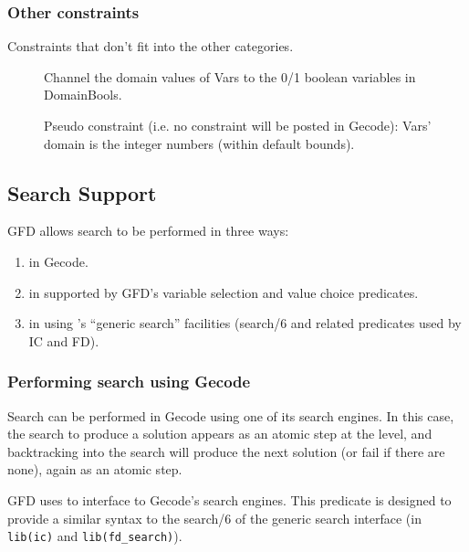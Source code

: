 \subsubsection{Other constraints}

Constraints that don't fit into the other categories.

\begin{description}

\item[]
Channel the domain values of Vars to the 0/1 boolean variables in DomainBools.

\item[]
Pseudo constraint (i.e. no constraint will be posted in Gecode):
Vars' domain is the integer numbers (within default bounds).

\end{description}


\subsection{Search Support}

GFD allows search to be performed in three ways:

\begin{enumerate}
\item in Gecode. 
\item in {\eclipse} supported by GFD's variable selection 
and value choice predicates. 
\item in {\eclipse} using \eclipse's ``generic search'' 
facilities (search/6 and related predicates used by IC and FD). 
\end{enumerate}

\subsubsection{Performing search using Gecode}
\label{searcheng}
Search can be performed in Gecode using one of its search engines. 
In this 
case, the search to produce a solution appears as an atomic step at
the {\eclipse} level, and backtracking into the search will produce the next 
solution (or fail if there are none), again as an atomic step.

GFD uses 
to interface to Gecode's search engines. This predicate is
designed to provide a similar syntax to the search/6 of the generic search 
interface (in {\tt lib(ic)} and {\tt lib(fd_search)}). 

